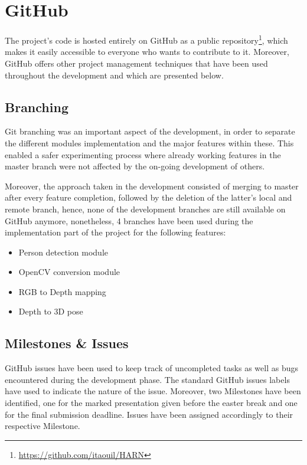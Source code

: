 
\section{GitHub}

The project's code is hosted entirely on GitHub as a public repository\footnote{ \url{https://github.com/itaouil/HARN}}, which makes it easily accessible to everyone who wants to contribute to it. Moreover, GitHub offers other project management techniques that have been used throughout the development and which are presented below.

\subsection{Branching}

Git branching was an important aspect of the development, in order to separate the different modules implementation and the major features within these. This enabled a safer experimenting process where already working features in the master branch were not affected by the on-going development of others. 

Moreover, the approach taken in the development consisted of merging to master after every feature completion, followed by the deletion of the latter's local and remote branch, hence, none of the development branches are still available on GitHub anymore, nonetheless, 4 branches have been used during the implementation part of the project for the following features:

\begin{itemize}
  \item Person detection module
  \item OpenCV conversion module
  \item RGB to Depth mapping
  \item Depth to 3D pose
\end{itemize}

\subsection{Milestones \& Issues}

GitHub issues have been used to keep track of uncompleted tasks as well as bugs encountered during the development phase. The standard GitHub issues labels have used to indicate the nature of the issue. Moreover, two Milestones have been identified, one for the marked presentation given before the easter break and one for the final submission deadline. Issues have been assigned accordingly to their respective Milestone.


